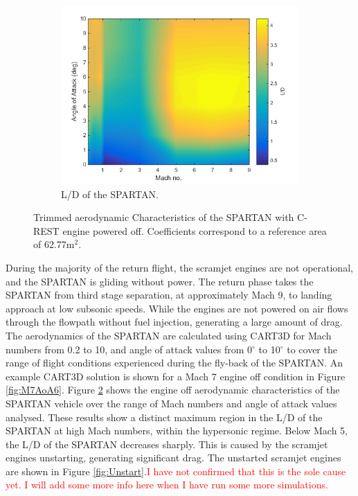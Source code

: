 \begin{figure}[ht]
\begin{subfigure}{.5\textwidth}
		\includegraphics[width=0.99\linewidth]{figures/3_vehicle_design/LD}
		\caption{L/D of the SPARTAN.}
		\label{fig:LD}
	\end{subfigure}
	\caption{Trimmed aerodynamic Characteristics of the SPARTAN with C-REST engine powered off. Coefficients correspond to a reference area of 62.77m$^2$.}
	\label{fig:aero1}
\end{figure}

During the majority of the return flight, the scramjet engines are not operational, and the SPARTAN is gliding without power. The return phase takes the SPARTAN from third stage separation, at approximately Mach 9, to landing approach at low subsonic speeds. 
 While the engines are not powered on air flows through the flowpath without fuel injection, generating a large amount of drag. 
The aerodynamics of the SPARTAN are calculated using CART3D for Mach numbers from 0.2 to 10, and angle of attack values from 0$^\circ$ to 10$^\circ$ to cover the range of flight conditions experienced during the fly-back of the SPARTAN.  An example CART3D solution is shown for a Mach 7 engine off condition in Figure  \ref{fig:M7AoA6}. 
Figure \ref{fig:aero1} shows the engine off aerodynamic characteristics of the SPARTAN vehicle over the range of Mach numbers and angle of attack values analysed.
These results show a distinct maximum region in the L/D of the SPARTAN at high Mach numbers, within the hypersonic regime. Below Mach 5, the L/D of the SPARTAN decreases sharply. This is caused by the scramjet engines unstarting, generating significant drag. The unstarted scramjet engines are shown in Figure \ref{fig:Unstart}.\textcolor{red}{I have not confirmed that this is the sole cause yet. I will add some more info here when I have run some more simulations.}

